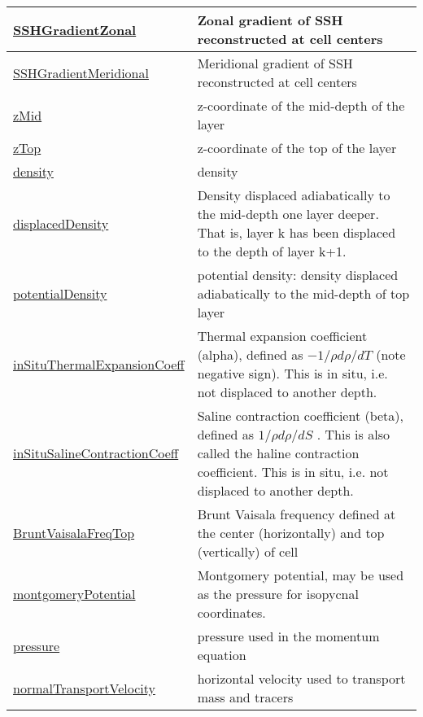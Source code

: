 {\begin{center}
\begin{longtable}{| p{2.0in} | p{4.0in} |}
	\hline
	\hyperref[subsec:var_sec_diagnostics_SSHGradientZonal]{SSHGradientZonal} & Zonal gradient of SSH reconstructed at cell centers \\
	\hline
	\hyperref[subsec:var_sec_diagnostics_SSHGradientMeridional]{SSHGradientMeridional} & Meridional gradient of SSH reconstructed at cell centers \\
	\hline
	\hyperref[subsec:var_sec_diagnostics_zMid]{zMid} & z-coordinate of the mid-depth of the layer \\
	\hline
	\hyperref[subsec:var_sec_diagnostics_zTop]{zTop} & z-coordinate of the top of the layer \\
	\hline
	\hyperref[subsec:var_sec_diagnostics_density]{density} & density \\
	\hline
	\hyperref[subsec:var_sec_diagnostics_displacedDensity]{displacedDensity} & Density displaced adiabatically to the mid-depth one layer deeper.  That is, layer k has been displaced to the depth of layer k+1. \\
	\hline
	\hyperref[subsec:var_sec_diagnostics_potentialDensity]{potentialDensity} & potential density: density displaced adiabatically to the mid-depth of top layer \\
	\hline
	\hyperref[subsec:var_sec_diagnostics_inSituThermalExpansionCoeff]{inSituThermalExpansionCoeff} &  Thermal expansion coefficient (alpha), defined as  $-1/\rho d\rho/dT$  (note negative sign).  This is in situ, i.e. not displaced to another depth. \\
	\hline
	\hyperref[subsec:var_sec_diagnostics_inSituSalineContractionCoeff]{inSituSalineContractionCoeff} &  Saline contraction coefficient (beta), defined as  $1/\rho d\rho/dS$ .  This is also called the haline contraction coefficient.  This is in situ, i.e. not displaced to another depth. \\
	\hline
	\hyperref[subsec:var_sec_diagnostics_BruntVaisalaFreqTop]{BruntVaisalaFreqTop} & Brunt Vaisala frequency defined at the center (horizontally) and top (vertically) of cell \\
	\hline
	\hyperref[subsec:var_sec_diagnostics_montgomeryPotential]{montgomeryPotential} & Montgomery potential, may be used as the pressure for isopycnal coordinates. \\
	\hline
	\hyperref[subsec:var_sec_diagnostics_pressure]{pressure} & pressure used in the momentum equation \\
	\hline
	\hyperref[subsec:var_sec_diagnostics_normalTransportVelocity]{normalTransportVelocity} & horizontal velocity used to transport mass and tracers \\

\end{longtable}
\end{center}}
